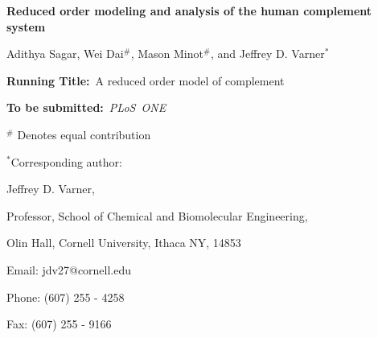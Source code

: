 \documentclass[12pt]{article}
\begin{document}
\begin{titlepage}
{\par\centering\textbf{\Large {Reduced order modeling and analysis of the human complement system}}}
\vspace{0.05in}
{\par \centering \large{Adithya Sagar, Wei Dai$^{\#}$, Mason Minot$^{\#}$, and Jeffrey D. Varner$^{*}$}}
\vspace{0.10in}
{\par {}}
{\par {}}
\vspace{0.1in}
{\par \centering \textbf{Running Title:}~A reduced order model of complement}
\vspace{0.1in}
{\par \centering \textbf{To be submitted:}~\emph{PLoS~ONE}}
\vspace{0.5in}
{\par \centering $^{\#}$ Denotes equal contribution}
\vspace{0.1in}
{\par \centering $^{*}$Corresponding author:}
{\par \centering Jeffrey D. Varner,}
{\par \centering Professor, School of Chemical and Biomolecular Engineering,}
{\par {} Olin Hall, Cornell University, Ithaca NY, 14853}
{\par \centering Email: jdv27@cornell.edu}
{\par \centering Phone: (607) 255 - 4258}
{\par \centering Fax: (607) 255 - 9166}
\end{titlepage}
\date{}
\thispagestyle{empty}
\pagebreak
\end{document}
